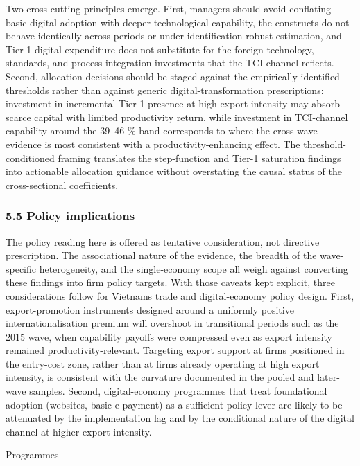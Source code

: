 \documentclass[12pt,a4paper]{article}
\begin{document}
Two cross-cutting principles emerge. First, managers should avoid
conflating basic digital adoption with deeper technological capability,
the constructs do not behave identically across periods or under
identification-robust estimation, and Tier-1 digital expenditure does
not substitute for the foreign-technology, standards, and
process-integration investments that the TCI channel reflects. Second,
allocation decisions should be staged against the empirically identified
thresholds rather than against generic digital-transformation
prescriptions: investment in incremental Tier-1 presence at high export
intensity may absorb scarce capital with limited productivity return,
while investment in TCI-channel capability around the 39--46 \% band
corresponds to where the cross-wave evidence is most consistent with a
productivity-enhancing effect. The threshold-conditioned framing
translates the step-function and Tier-1 saturation findings into
actionable allocation guidance without overstating the causal status of
the cross-sectional coefficients.

\hypertarget{55-policy-implications}{%
\subsubsection{5.5 Policy implications}\label{55-policy-implications}}

The policy reading here is offered as tentative consideration, not
directive prescription. The associational nature of the evidence, the
breadth of the wave-specific heterogeneity, and the single-economy scope
all weigh against converting these findings into firm policy targets.
With those caveats kept explicit, three considerations follow for
Vietnam\textquotesingle s trade and digital-economy policy design.
First, export-promotion instruments designed around a uniformly positive
internationalisation premium will overshoot in transitional periods such
as the 2015 wave, when capability payoffs were compressed even as export
intensity remained productivity-relevant. Targeting export support at
firms positioned in the entry-cost zone, rather than at firms already
operating at high export intensity, is consistent with the curvature
documented in the pooled and later-wave samples. Second, digital-economy
programmes that treat foundational adoption (websites, basic e-payment)
as a sufficient policy lever are likely to be attenuated by the
implementation lag and by the conditional nature of the digital channel
at higher export intensity.

Programmes
\end{document}
